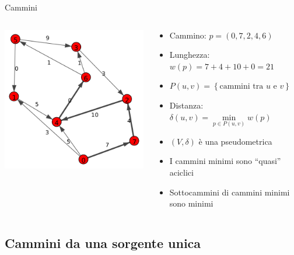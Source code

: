 \documentclass{beamer}
\theoremstyle{plain}
\theoremstyle{definition}
\theoremstyle{remark}
\newcommand{\set}[1]{\left\{#1\right\}}
\newcommand{\pa}[1]{\left(#1\right)}
\begin{document}
\begin{frame}{Cammini}
  \begin{columns}
    \begin{column}{0.40\textwidth}
      \includegraphics[width=\textwidth]{directpath}
    \end{column}
    \begin{column}{0.58\textwidth}
      \begin{itemize}
      \item Cammino: $p = \pa{ 0,7,2, 4,6}$
      \item Lunghezza: $w(p) = 7+4+10+0 = 21$
      \item $P(u,v) = \set{\text{cammini tra }u\text{ e }v}$
      \item Distanza: $\delta (u,v) = \min \limits _{p\in P(u,v)}
        w(p)$
      \item $\pa{V,\delta}$ \`e una pseudometrica
      \item I cammini minimi sono ``quasi'' aciclici
      \item Sottocammini di cammini minimi sono minimi
      \end{itemize}
    \end{column}
  \end{columns}
\end{frame}

\subsection{Cammini da una sorgente unica}
\end{document}
